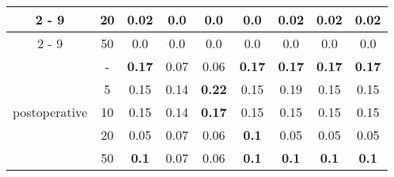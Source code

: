 \documentclass{article}%
\begin{document}
\begin{tabular}{c|c|ccccccc}
\cline{2%
-%
9}%
&20&\textbf{0.02}&0.0&0.0&0.0&\textbf{0.02}&\textbf{0.02}&\textbf{0.02}\\%
\cline{2%
-%
9}%
&50&0.0&0.0&0.0&0.0&0.0&0.0&0.0\\%
\hline%
\multirow{5}{*}{postoperative}&{-}&\textbf{0.17}&0.07&0.06&\textbf{0.17}&\textbf{0.17}&\textbf{0.17}&\textbf{0.17}\\%
\cline{2%
-%
9}%
&5&0.15&0.14&\textbf{0.22}&0.15&0.19&0.15&0.15\\%
\cline{2%
-%
9}%
&10&0.15&0.14&\textbf{0.17}&0.15&0.15&0.15&0.15\\%
\cline{2%
-%
9}%
&20&0.05&0.07&0.06&\textbf{0.1}&0.05&0.05&0.05\\%
\cline{2%
-%
9}%
&50&\textbf{0.1}&0.07&0.06&\textbf{0.1}&\textbf{0.1}&\textbf{0.1}&\textbf{0.1}\\%
\hline%
\end{tabular}

%
\end{document}
